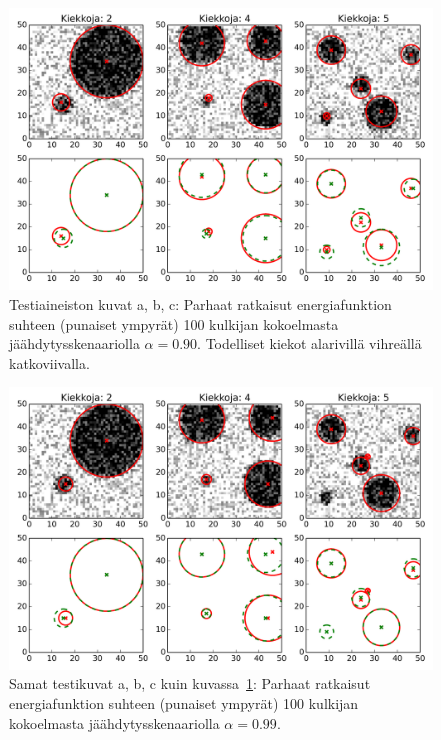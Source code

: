\begin{figure}[htpb]
    \centering
    \includegraphics[width=1.0\linewidth]{figures/A_datasets_res_fast.png}
    \caption{Testiaineiston kuvat a, b, c: Parhaat ratkaisut energiafunktion suhteen (punaiset ympyrät) 100 kulkijan kokoelmasta jäähdytysskenaariolla $\alpha = 0.90$.
        Todelliset kiekot alarivillä vihreällä katkoviivalla.
        \label{fig:A_datasets_res_fast}
    }
\end{figure}


\begin{figure}[htpb]
    \centering
    \includegraphics[width=1.0\linewidth]{figures/A_datasets_res_slow.png}
    \caption{Samat testikuvat a, b, c kuin kuvassa~\ref{fig:A_datasets_res_fast}: Parhaat ratkaisut energiafunktion suhteen (punaiset ympyrät) 100 kulkijan kokoelmasta jäähdytysskenaariolla $\alpha = 0.99$.
        \label{fig:A_datasets_res_slow}
    }
\end{figure}

